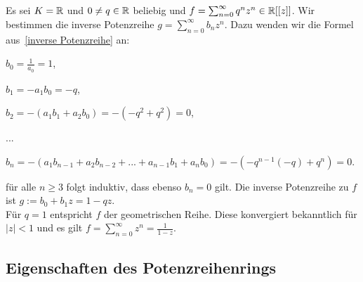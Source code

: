 %
\begin{bsp} %
Es sei $K = \mathbb{R}$ und $0\neq q \in \mathbb{R}$ beliebig und $f = \sum_{n=0}^{\infty}q^n z^n \in \mathbb{R}[[z]]$. Wir bestimmen die inverse Potenzreihe $g = \sum_{n = 0}^{\infty} b_n z^n$. Dazu wenden wir die Formel aus~\ref{inverse Potenzreihe} an:
\begin{center}
\begin{description}
\item $b_0 = \frac{1}{a_0} = 1$,
\item $b_1 = -a_1b_0 = -q$,
\item $b_2 = -\left(a_1b_1 + a_2b_0\right) = -\left(-q^2 + q^2\right) = 0$,
\item ...
\item $b_n = -\left(a_1b_{n-1} + a_2b_{n-2} + ... + a_{n-1}b_1 + a_nb_0\right) = -\left(-q^{n-1}(-q) + q^n\right) = 0$.
\end{description}
\end{center}
für alle $n \ge 3$ folgt induktiv, dass ebenso $b_n = 0$ gilt. Die inverse Potenzreihe zu $f$ ist $g := b_0 + b_1z = 1 - qz$. \\
Für $q = 1$ entspricht $f$ der geometrischen Reihe. Diese konvergiert bekanntlich für $|z| < 1$ und es gilt $f = \sum_{n= 0}^{\infty} z^n = \frac{1}{1-z}$.
\end{bsp}
%
%
%
%
%
%
%
%
%
%
\subsection{Eigenschaften des Potenzreihenrings}

